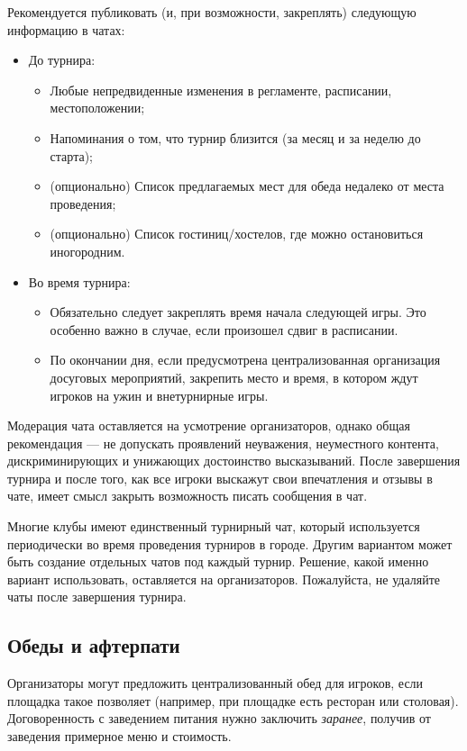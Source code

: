 Рекомендуется публиковать (и, при возможности, закреплять) следующую информацию в чатах:
\begin{itemize}
	\item До турнира:
	\begin{itemize}
		\item Любые непредвиденные изменения в регламенте, расписании, местоположении;
		\item Напоминания о том, что турнир близится (за месяц и за неделю до старта);
		\item (опционально) Список предлагаемых мест для обеда недалеко от места проведения;
		\item (опционально) Список гостиниц/хостелов, где можно остановиться иногородним.
	\end{itemize}
	\item Во время турнира:
	\begin{itemize}
		\item Обязательно следует закреплять время начала следующей игры. Это особенно важно в случае, если произошел сдвиг в расписании.
		\item По окончании дня, если предусмотрена централизованная организация досуговых мероприятий, закрепить место и время, в котором ждут игроков на ужин и внетурнирные игры.
	\end{itemize}
\end{itemize}

Модерация чата оставляется на усмотрение организаторов, однако общая рекомендация --- не допускать проявлений неуважения, неуместного контента, дискриминирующих и унижающих достоинство высказываний. После завершения турнира и после того, как все игроки выскажут свои впечатления и отзывы в чате, имеет смысл закрыть возможность писать сообщения в чат. 

Многие клубы имеют единственный турнирный чат, который используется периодически во время проведения турниров в городе. Другим вариантом может быть создание отдельных чатов под каждый турнир. Решение, какой именно вариант использовать, оставляется на организаторов. Пожалуйста, не удаляйте чаты после завершения турнира.

\subsection{Обеды и афтерпати}

Организаторы могут предложить централизованный обед для игроков, если площадка такое позволяет (например, при площадке есть ресторан или столовая). Договоренность с заведением питания нужно заключить \textit{заранее}, получив от заведения примерное меню и стоимость.


